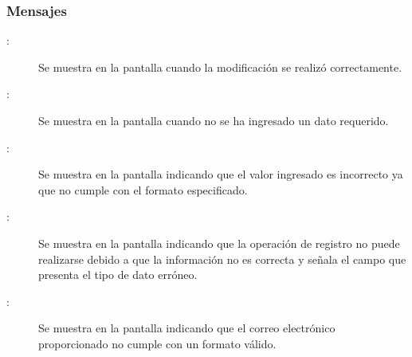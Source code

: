 \subsubsection{Mensajes}

	
\begin{description}
	  \item[:] Se muestra en la pantalla  cuando la modificación se realizó correctamente.
	  \item[:] Se muestra en la pantalla  cuando no se ha ingresado un dato requerido.
	  \item[:] Se muestra en la pantalla  indicando que el valor ingresado es incorrecto ya que no cumple con el formato especificado.
	  \item[:] Se muestra en la pantalla   indicando que la operación de registro no puede realizarse debido a que la información no es correcta y señala el campo que presenta el tipo de dato erróneo. 
	  \item[:] Se muestra en la pantalla  indicando que el correo electrónico proporcionado no cumple con un formato válido.
\end{description}
